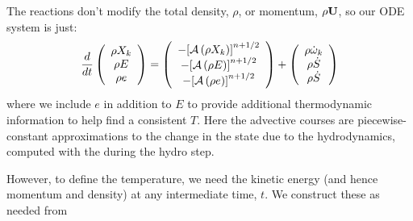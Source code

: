 The reactions don't modify the total density, $\rho$, or momentum,
$\rho {\bf U}$, so our ODE system is just:
\begin{equation}
\frac{d}{dt}\left ( 
   \begin{array}{c} \rho X_k \\ \rho E \\  \rho e \end{array} 
\right ) = 
\left ( \begin{array}{c}
   -{\left [\mathcal{A} \left(\rho X_k\right)\right]}^{n+1/2} \\ -{\left [\mathcal{A} \left(\rho E\right)\right]}^{n+1/2} \\ -{\left [\mathcal{A} \left(\rho e\right)\right]}^{n+1/2} \\
\end{array} \right ) +
\left (
   \begin{array}{c} \rho \dot{\omega}_k \\ \rho \dot{S} \\ \rho \dot{S} \end{array}
\right )
\end{equation}
where we include $e$ in addition to $E$ to provide additional thermodynamic 
information to help find a consistent $T$.  Here the advective courses
are piecewise-constant approximations to the change in the state due
to the hydrodynamics, computed with the during the hydro step.

However, to define the temperature, we need the kinetic energy (and
hence momentum and density) at any intermediate time, $t$.  We construct
these as needed from 
